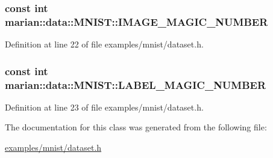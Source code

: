 \subsubsection[{\texorpdfstring{I\+M\+A\+G\+E\+\_\+\+M\+A\+G\+I\+C\+\_\+\+N\+U\+M\+B\+ER}{IMAGE_MAGIC_NUMBER}}]{\setlength{\rightskip}{0pt plus 5cm}const int marian\+::data\+::\+M\+N\+I\+S\+T\+::\+I\+M\+A\+G\+E\+\_\+\+M\+A\+G\+I\+C\+\_\+\+N\+U\+M\+B\+ER\hspace{0.3cm}{\ttfamily [private]}}\hypertarget{classmarian_1_1data_1_1MNIST_ad57aae96aaef230ede91eadb4d2cbbb7}{}\label{classmarian_1_1data_1_1MNIST_ad57aae96aaef230ede91eadb4d2cbbb7}


Definition at line 22 of file examples/mnist/dataset.\+h.

\subsubsection[{\texorpdfstring{L\+A\+B\+E\+L\+\_\+\+M\+A\+G\+I\+C\+\_\+\+N\+U\+M\+B\+ER}{LABEL_MAGIC_NUMBER}}]{\setlength{\rightskip}{0pt plus 5cm}const int marian\+::data\+::\+M\+N\+I\+S\+T\+::\+L\+A\+B\+E\+L\+\_\+\+M\+A\+G\+I\+C\+\_\+\+N\+U\+M\+B\+ER\hspace{0.3cm}{\ttfamily [private]}}\hypertarget{classmarian_1_1data_1_1MNIST_a6c03087f0ab278cfdf5168985497135d}{}\label{classmarian_1_1data_1_1MNIST_a6c03087f0ab278cfdf5168985497135d}


Definition at line 23 of file examples/mnist/dataset.\+h.



The documentation for this class was generated from the following file\+:\begin{DoxyCompactItemize}
\item 
\hyperlink{examples_2mnist_2dataset_8h}{examples/mnist/dataset.\+h}\end{DoxyCompactItemize}
